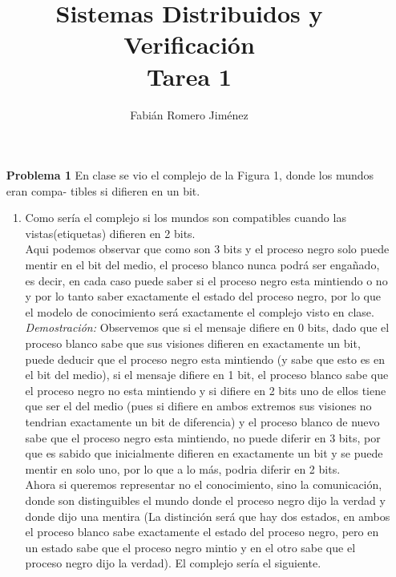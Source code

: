 \documentclass{article}
\title{Sistemas Distribuidos y Verificación \\ Tarea 1}
\author{Fabián Romero Jiménez}
\begin{document}
\maketitle

\begin{enumerate}

\item[\bf{Problema 1}] En clase se vio el complejo de la Figura 1, donde los mundos eran compa- tibles si difieren en un bit.\\

\begin{enumerate}

\item Como sería el complejo si los mundos son compatibles cuando las vistas(etiquetas) difieren en 2 bits.\\

Aqui podemos observar que como son 3 bits y el proceso negro solo puede mentir en el bit del medio, el proceso blanco nunca podrá ser engañado, es decir, en cada caso puede saber si el proceso negro esta mintiendo o no y por lo tanto saber exactamente el estado del proceso negro, por lo que el modelo de conocimiento será exactamente el complejo visto en clase.\\

\emph{Demostración:} Observemos que si el mensaje difiere en 0 bits, dado que el proceso blanco sabe que sus visiones difieren en exactamente un bit, puede deducir que el proceso negro esta mintiendo (y sabe que esto es en el bit del medio), si el mensaje difiere en 1 bit, el proceso blanco sabe que el proceso negro no esta mintiendo y si difiere en 2 bits uno de ellos tiene que ser el del medio (pues si difiere en ambos extremos sus visiones no tendrian exactamente un bit de diferencia) y el proceso blanco de nuevo sabe que el proceso negro esta mintiendo, no puede diferir en 3 bits, por que es sabido que inicialmente difieren en exactamente un bit y se puede mentir en solo uno, por lo que a lo más, podria diferir en 2 bits.\\

Ahora si queremos representar no el conocimiento, sino la comunicación, donde son distinguibles el mundo donde el proceso negro dijo la verdad y donde dijo una mentira (La distinción será que hay dos estados, en ambos el proceso blanco sabe exactamente el estado del proceso negro, pero en un estado sabe que el proceso negro mintio y en el otro sabe que el proceso negro dijo la verdad). El complejo sería el siguiente.


\end{enumerate}
\end{enumerate}
\end{document}
